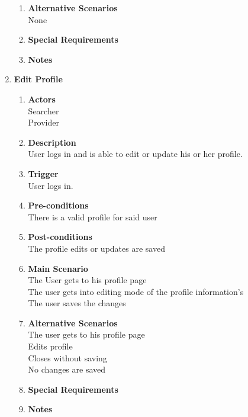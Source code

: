 \documentclass{scrreprt}
\begin{document}
\begin{enumerate}
\begin{enumerate}
		\item \textbf{Alternative Scenarios} \\
			None\\
		\item \textbf{Special Requirements} \\

		\item \textbf{Notes} \\
	\end{enumerate}


	\item \textbf{Edit Profile}
	\begin{enumerate}
		\item \textbf{Actors}  \\
			Searcher\\
			Provider\\

		\item \textbf{Description} \\
			User logs in and is able to edit or update his or her profile.\\
			
		\item \textbf{Trigger} \\
			User logs in.\\

		\item \textbf{Pre-conditions} \\
			There is a valid profile for said user\\

		\item \textbf{Post-conditions} \\
			The profile edits or updates are saved\\

		\item \textbf{Main Scenario} \\
			The User gets to his profile page\\
			The user gets into editing mode of the profile information’s\\
			The user saves the changes\\

		\item \textbf{Alternative Scenarios} \\
			The user gets to his profile page\\
			Edits profile\\
			Closes without saving\\
			No changes are saved\\
		\item \textbf{Special Requirements} \\

		\item \textbf{Notes} \\
	\end{enumerate}


\end{enumerate}
\end{document}
